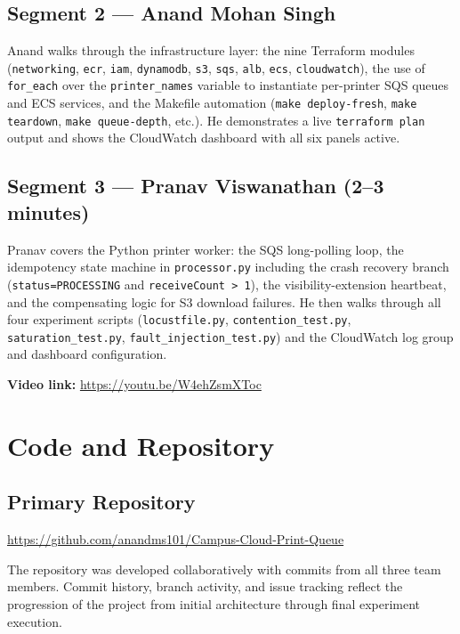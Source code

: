 \documentclass[11pt,letterpaper]{article}
\newcommand{\code}[1]{\texttt{\small #1}}
\begin{document}
\subsection{Segment 2 --- Anand Mohan Singh }
Anand walks through the infrastructure layer: the nine Terraform modules (\code{networking}, \code{ecr}, \code{iam}, \code{dynamodb}, \code{s3}, \code{sqs}, \code{alb}, \code{ecs}, \code{cloudwatch}), the use of \code{for\_each} over the \code{printer\_names} variable to instantiate per-printer SQS queues and ECS services, and the Makefile automation (\code{make deploy-fresh}, \code{make teardown}, \code{make queue-depth}, etc.). He demonstrates a live \code{terraform plan} output and shows the CloudWatch dashboard with all six panels active.

\subsection{Segment 3 --- Pranav Viswanathan (2--3 minutes)}
Pranav covers the Python printer worker: the SQS long-polling loop, the idempotency state machine in \code{processor.py} including the crash recovery branch (\code{status=PROCESSING} and \code{receiveCount > 1}), the visibility-extension heartbeat, and the compensating logic for S3 download failures. He then walks through all four experiment scripts (\code{locustfile.py}, \code{contention\_test.py}, \code{saturation\_test.py}, \code{fault\_injection\_test.py}) and the CloudWatch log group and dashboard configuration.

\medskip
\begin{tcolorbox}[
  colback=surface,
  colframe=border,
  boxrule=0.6pt,
  arc=2pt,
  left=8pt, right=8pt, top=5pt, bottom=5pt,
]
  \textbf{Video link:} \url{https://youtu.be/W4ehZsmXToc}
\end{tcolorbox}


\section{Code and Repository}
\label{sec:code}

\subsection{Primary Repository}
\url{https://github.com/anandms101/Campus-Cloud-Print-Queue}

The repository was developed collaboratively with commits from all three team members. Commit history, branch activity, and issue tracking reflect the progression of the project from initial architecture through final experiment execution.
\end{document}
